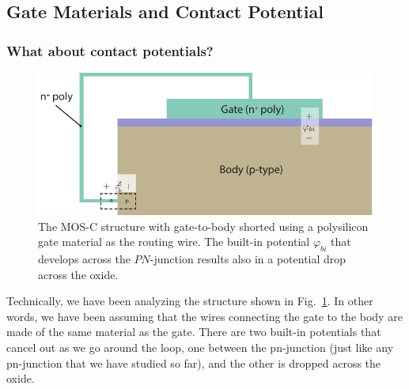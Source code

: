 \subsection{Gate Materials and Contact Potential}
\subsubsection{What about contact potentials?}
\begin{figure}[tbh]
\centering
\includegraphics[width=.75\columnwidth]{mos_cap_short_phibi}
\caption{The MOS-C structure with gate-to-body shorted using a polysilicon gate material as the routing wire.  The built-in potential $\varphi_{bi}$ that develops across the $PN$-junction results also in a  potential drop across the oxide.}
\label{fig:mos_cap_gate_body_short_gate}
\end{figure}
Technically, we have been analyzing the structure shown in Fig.~\ref{fig:mos_cap_gate_body_short_gate}.  In other words, we have been assuming that the wires connecting the gate to the body are made of the same material as the gate.  There are two built-in potentials that cancel out as we go around the loop, one between the pn-junction (just like any pn-junction that we have studied so far), and the other is dropped across the oxide.  
